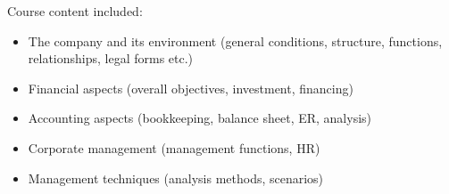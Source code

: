 Course content included:
\begin{itemize}
    \item The company and its environment (general conditions, structure, functions, relationships, legal forms etc.)
    \item Financial aspects (overall objectives, investment, financing)
    \item Accounting aspects (bookkeeping, balance sheet, ER, analysis)
    \item Corporate management (management functions, HR)
    \item Management techniques (analysis methods, scenarios)
\end{itemize}